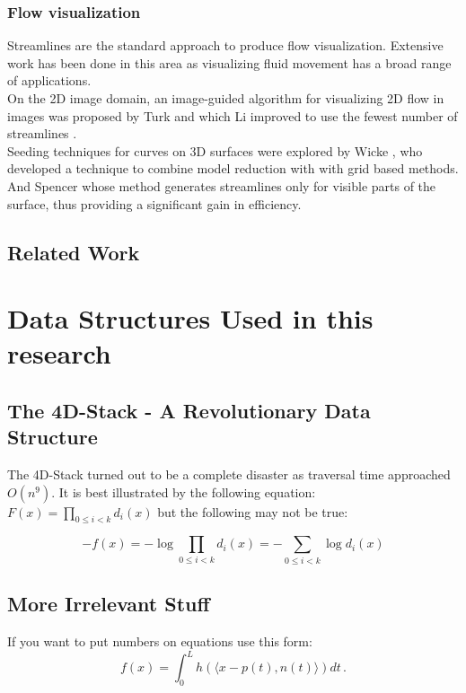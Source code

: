 \documentclass[11pt]{report}
\begin{document}
\subsection{Flow visualization}

Streamlines are the standard approach to produce flow visualization.
Extensive work has been done in this area as visualizing fluid movement has a broad range of applications. \\

On the 2D image domain, an image-guided algorithm for visualizing 2D flow in images was proposed by Turk \cite{Turk1996} and which Li improved to use the fewest number of streamlines \cite{Li2008}. \\

Seeding techniques for curves on 3D surfaces were explored by Wicke \cite{Wicke2009}, who developed a technique to combine model reduction with with grid based methods.
And Spencer \cite{Spencer2009} whose method generates streamlines only for visible parts of the surface, thus providing a significant gain in efficiency.

\section{Related Work}


\chapter{Data Structures Used in this research}
\section{The 4D-Stack - A Revolutionary Data Structure}
The 4D-Stack turned out to be a complete disaster as traversal time approached $O(n^9).$
It is best illustrated by the following equation: $F(x) = \prod_{0\leq i<k}d_i(x)$
but the following may not be true:

\[
-f(x) = - \log \prod_{0\leq i<k}d_i(x) = - \sum_{0\leq i<k} \log d_i(x)
\]


\section{More Irrelevant Stuff}
If you want to put numbers on equations use this form:
\begin{equation}
\label{integralrep}
f(x)=\int_0^L h( \langle x-p(t),n(t) \rangle ) dt\,.
\end{equation}
\end{document}

